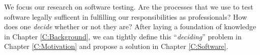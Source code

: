 We focus our research on software testing. Are the processes that we use to test
software legally sufficent in fulfilling our responsibilities as professionals?
How does one \textit{decide} whether or not they are? After laying a foundation
of knowledge in Chapter \ref{C:Background}, we can tightly define this 
``\textit{deciding}'' problem in Chapter \ref{C:Motivation} and propose a solution
in Chapter \ref{C:Software}.
